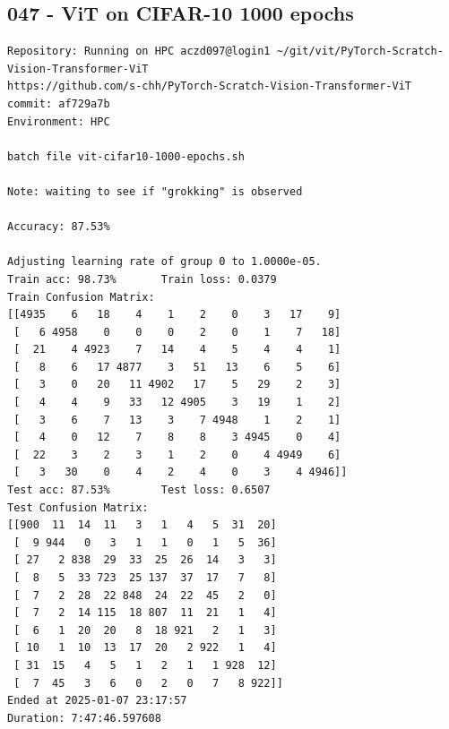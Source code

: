 \subsection{047 - ViT on CIFAR-10 1000 epochs}
\label{app_res:047}
\begin{verbatim}
Repository: Running on HPC aczd097@login1 ~/git/vit/PyTorch-Scratch-Vision-Transformer-ViT
https://github.com/s-chh/PyTorch-Scratch-Vision-Transformer-ViT
commit: af729a7b
Environment: HPC

batch file vit-cifar10-1000-epochs.sh

Note: waiting to see if "grokking" is observed

Accuracy: 87.53%

Adjusting learning rate of group 0 to 1.0000e-05.
Train acc: 98.73%       Train loss: 0.0379
Train Confusion Matrix:
[[4935    6   18    4    1    2    0    3   17    9]
 [   6 4958    0    0    0    2    0    1    7   18]
 [  21    4 4923    7   14    4    5    4    4    1]
 [   8    6   17 4877    3   51   13    6    5    6]
 [   3    0   20   11 4902   17    5   29    2    3]
 [   4    4    9   33   12 4905    3   19    1    2]
 [   3    6    7   13    3    7 4948    1    2    1]
 [   4    0   12    7    8    8    3 4945    0    4]
 [  22    3    2    3    1    2    0    4 4949    6]
 [   3   30    0    4    2    4    0    3    4 4946]]
Test acc: 87.53%        Test loss: 0.6507
Test Confusion Matrix:
[[900  11  14  11   3   1   4   5  31  20]
 [  9 944   0   3   1   1   0   1   5  36]
 [ 27   2 838  29  33  25  26  14   3   3]
 [  8   5  33 723  25 137  37  17   7   8]
 [  7   2  28  22 848  24  22  45   2   0]
 [  7   2  14 115  18 807  11  21   1   4]
 [  6   1  20  20   8  18 921   2   1   3]
 [ 10   1  10  13  17  20   2 922   1   4]
 [ 31  15   4   5   1   2   1   1 928  12]
 [  7  45   3   6   0   2   0   7   8 922]]
Ended at 2025-01-07 23:17:57
Duration: 7:47:46.597608

\end{verbatim}

